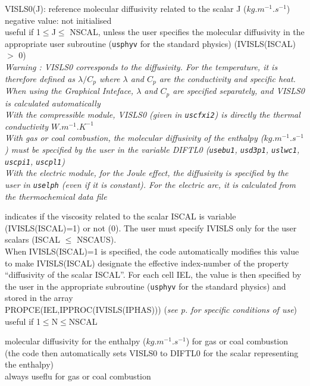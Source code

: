 {VISLS0(J): reference molecular diffusivity related to the scalar J
($kg.m^{-1}.s^{-1}$)\\
negative value: not initialised\\
useful if 1$\leqslant$J$\leqslant$ NSCAL, unless the user specifies the
molecular diffusivity in the appropriate user subroutine (\texttt{usphyv} for
the standard physics) (IVISLS(ISCAL) $>$ 0)\\
{\em Warning : VISLS0 corresponds to the diffusivity. For the temperature, it is
therefore defined as $\lambda/C_p$ where $\lambda$ and $C_p$ are the
conductivity and specific heat. When using the Graphical Inteface, $\lambda$ and
$C_p$ are specified separately, and VISLS0 is calculated automatically\\
With the compressible module, VISLS0 (given in \texttt{uscfxi2}) is directly the
thermal conductivity $W.m^{-1}.K^{-1}$\\
With gas or coal combustion, the molecular diffusivity of the enthalpy 
($kg.m^{-1}.s^{-1}$) must be specified by the user in the variable DIFTL0 (\texttt{usebu1},
\texttt{usd3p1}, \texttt{uslwc1}, \texttt{uscpi1}, \texttt{uscpl1})\\
With the electric module, for the Joule effect, the diffusivity is specified by
the user in \texttt{uselph} (even if it is constant). For the electric arc, it
is calculated from the thermochemical data file}} 

{indicates if the viscosity related to the scalar ISCAL is variable
(IVISLS(ISCAL)=1) or not (0). The user must specify IVISLS only for the
user scalars (ISCAL $\leqslant$ NSCAUS).\\
When IVISLS(ISCAL)=1 is specified, the code automatically modifies this value to
make IVISLS(ISCAL) designate the effective index-number of the property
``diffusivity of the scalar ISCAL''. For each cell IEL, the value 
is then specified by the user in the appropriate subroutine
(\texttt{usphyv} for the standard physics) and stored in the array\\
PROPCE(IEL,IPPROC(IVISLS(IPHAS)))  
({\em see p.\pageref{prg_propvar} for specific conditions of use})\\
useful if 1$\leqslant$N$\leqslant$NSCAL}


{molecular diffusivity for the enthalpy ($kg.m^{-1}.s^{-1}$) for gas or coal
combustion (the code then automatically sets VISLS0 to DIFTL0 for the scalar
representing the enthalpy)\\
always useflu for gas or coal combustion}

